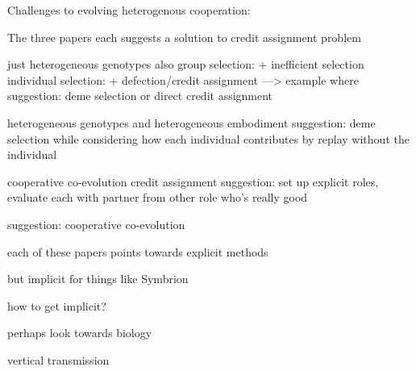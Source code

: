 Challenges to evolving heterogenous cooperation:

The three papers each suggests a solution to credit assignment problem

just heterogeneous genotypes
\cite{waibel2009genetic}
also \cite{perez2003effects}
group selection:
+ inefficient selection
individual selection:
+ defection/credit assignment
---> example where
suggestion: deme selection or direct credit assignment

heterogeneous genotypes and heterogeneous embodiment
\cite{knudson2010coevolution}
suggestion: deme selection while considering how each individual contributes by replay without the individual

cooperative co-evolution \cite{gomes2015cooperative}
credit assignment
suggestion: set up explicit roles, evaluate each with partner from other role who's really good



suggestion: cooperative co-evolution

each of these papers points towards explicit methods

but implicit for things like Symbrion \cite{kernbach2008symbiotic}

how to get implicit?

perhaps look towards biology \cite{vostinar2017suicide}

vertical transmission
